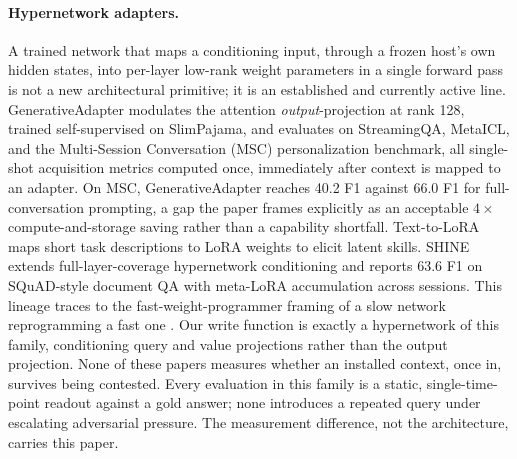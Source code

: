 \paragraph{Hypernetwork adapters.} A trained network that maps a
conditioning input, through a frozen host's own hidden states, into per-layer low-rank
weight parameters in a single forward pass is not a new architectural primitive; it is
an established and currently active line. GenerativeAdapter \citep{chen2025generativeadapter}
modulates the attention \emph{output}-projection at rank 128, trained self-supervised on
SlimPajama, and evaluates on StreamingQA, MetaICL, and the Multi-Session Conversation
(MSC) personalization benchmark, all single-shot acquisition metrics computed once,
immediately after context is mapped to an adapter. On MSC, GenerativeAdapter reaches
40.2 F1 against 66.0 F1 for full-conversation prompting, a gap the paper frames
explicitly as an acceptable $4\times$ compute-and-storage saving rather than a
capability shortfall. Text-to-LoRA \citep{charakorn2025texttolora} maps short task
descriptions to LoRA weights to elicit latent skills. SHINE \citep{liu2026shine} extends
full-layer-coverage hypernetwork conditioning and reports 63.6 F1 on SQuAD-style
document QA with meta-LoRA accumulation across sessions. This lineage traces to the
fast-weight-programmer framing of a slow network reprogramming a fast one
\citep{schmidhuber1993reduce,ba2016fastweights,schlag2021linear}. Our write function is
exactly a hypernetwork of this family, conditioning query and value projections rather
than the output projection. None of these papers measures whether an installed
context, once in, survives being contested. Every evaluation in this family is a
static, single-time-point readout against a gold answer; none introduces a repeated
query under escalating adversarial pressure. The measurement difference, not the
architecture, carries this paper.

